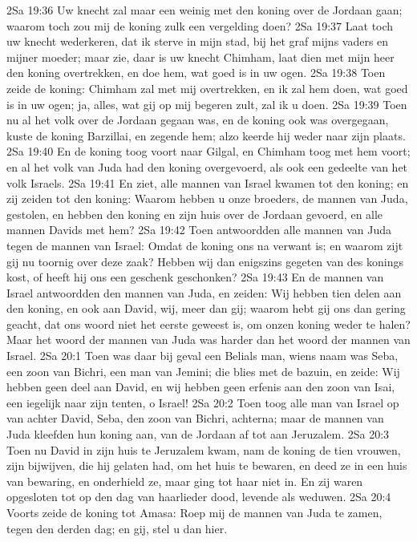 2Sa 19:36  Uw knecht zal maar een weinig met den koning over de Jordaan gaan; waarom toch zou mij de koning zulk een vergelding doen?
2Sa 19:37  Laat toch uw knecht wederkeren, dat ik sterve in mijn stad, bij het graf mijns vaders en mijner moeder; maar zie, daar is uw knecht Chimham, laat dien met mijn heer den koning overtrekken, en doe hem, wat goed is in uw ogen.
2Sa 19:38  Toen zeide de koning: Chimham zal met mij overtrekken, en ik zal hem doen, wat goed is in uw ogen; ja, alles, wat gij op mij begeren zult, zal ik u doen.
2Sa 19:39  Toen nu al het volk over de Jordaan gegaan was, en de koning ook was overgegaan, kuste de koning Barzillai, en zegende hem; alzo keerde hij weder naar zijn plaats.
2Sa 19:40  En de koning toog voort naar Gilgal, en Chimham toog met hem voort; en al het volk van Juda had den koning overgevoerd, als ook een gedeelte van het volk Israels.
2Sa 19:41  En ziet, alle mannen van Israel kwamen tot den koning; en zij zeiden tot den koning: Waarom hebben u onze broeders, de mannen van Juda, gestolen, en hebben den koning en zijn huis over de Jordaan gevoerd, en alle mannen Davids met hem?
2Sa 19:42  Toen antwoordden alle mannen van Juda tegen de mannen van Israel: Omdat de koning ons na verwant is; en waarom zijt gij nu toornig over deze zaak? Hebben wij dan enigszins gegeten van des konings kost, of heeft hij ons een geschenk geschonken?
2Sa 19:43  En de mannen van Israel antwoordden den mannen van Juda, en zeiden: Wij hebben tien delen aan den koning, en ook aan David, wij, meer dan gij; waarom hebt gij ons dan gering geacht, dat ons woord niet het eerste geweest is, om onzen koning weder te halen? Maar het woord der mannen van Juda was harder dan het woord der mannen van Israel.
2Sa 20:1  Toen was daar bij geval een Belials man, wiens naam was Seba, een zoon van Bichri, een man van Jemini; die blies met de bazuin, en zeide: Wij hebben geen deel aan David, en wij hebben geen erfenis aan den zoon van Isai, een iegelijk naar zijn tenten, o Israel!
2Sa 20:2  Toen toog alle man van Israel op van achter David, Seba, den zoon van Bichri, achterna; maar de mannen van Juda kleefden hun koning aan, van de Jordaan af tot aan Jeruzalem.
2Sa 20:3  Toen nu David in zijn huis te Jeruzalem kwam, nam de koning de tien vrouwen, zijn bijwijven, die hij gelaten had, om het huis te bewaren, en deed ze in een huis van bewaring, en onderhield ze, maar ging tot haar niet in. En zij waren opgesloten tot op den dag van haarlieder dood, levende als weduwen.
2Sa 20:4  Voorts zeide de koning tot Amasa: Roep mij de mannen van Juda te zamen, tegen den derden dag; en gij, stel u dan hier.
